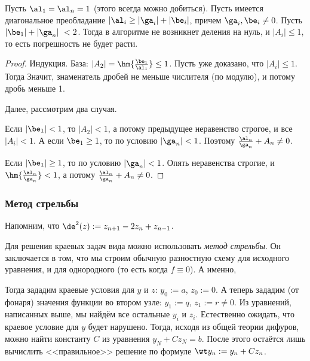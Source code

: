 \documentclass[a4paper]{article}
\begin{document}
\begin{theorem}
Пусть $\al_1 = \al_n=1$ (этого всегда можно добиться). Пусть имеется
диагональное преобладание $|\al_i \ge |\ga_i| + |\be_i|$, причем
$\ga_i, \be_i \neq 0$. Пусть $|\be_1| + |\ga_n|\ < 2$.  Тогда в
алгоритме не возникнет деления на нуль, и $|A_i|\le 1$, то есть
погрешность не будет расти.
\end{theorem}
\begin{proof}
Индукция. База: $|A_2| = \hm{\frac {\be_1}{\al_1}} \le 1$. Пусть уже
доказано, что $|A_i|\le1$. Тогда   Значит, знаменатель дробей не меньше числителя (по
модулю), и потому дробь меньше 1.

Далее, рассмотрим два случая.

 Если $|\be_1| < 1$, то $|A_2| <1$, а потому предыдущее
неравенство строгое, и все $|A_i| < 1$.  А если $\be_1 \ge 1$, то по
условию $|\ga_n| < 1$. Поэтому $\frac{\al_n}{\ga_n} + A_n \neq 0$.

 Если $|\be_1| \ge 1$, то по условию $|\ga_n| < 1$. Опять
неравенства строгие, и $\hm{\frac{\al_n}{\ga_n}}<1$, а потому
$\frac{\al_n}{\ga_n} + A_n \neq 0$.
\end{proof}

\subsubsection{Метод стрельбы}

Напомним, что $\de^2 (z) := z_{n+1}-2z_n + z_{n-1}$.

Для решения краевых задач вида 
можно использовать \emph{метод стрельбы}.  Он заключается в том, что
мы строим обычную разностную схему для исходного уравнения, и для
однородного (то есть когда $f\equiv 0$).  А именно,

Тогда зададим краевые условия для $y$ и $z$: $y_0 := a$, $z_0 := 0$.
А теперь зададим (от фонаря) значения функции во втором узле: $y_1 :=
q$, $z_1 := r \ne 0$.  Из уравнений, написанных выше, мы найдём все
остальные $y_i$ и $z_i$. Естественно ожидать, что краевое условие для
$y$ будет нарушено.  Тогда, исходя из общей теории дифуров, можно
найти константу $C$ из уравнения $y_N + C z_N = b$.  После этого
остаётся лишь вычислить <<правильное>> решение по формуле $\wt y_n :=
y_n + C z_n$.
\end{document}
